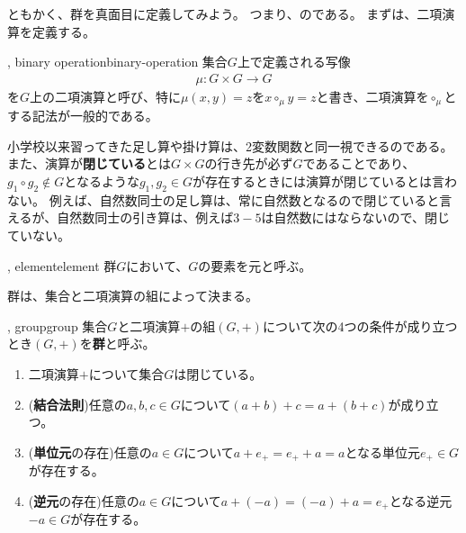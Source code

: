ともかく、群を真面目に定義してみよう。
つまり、のである。
まずは、二項演算を定義する。

\begin{Defi}{, binary operation}{binary-operation}
集合$G$上で定義される写像
\begin{align*}
\mu : G \times G \to G
\end{align*}
を$G$上の二項演算と呼び、特に$\mu(x,y)=z$を$x\circ_{\mu}y=z$と書き、二項演算を$\circ_{\mu}$とする記法が一般的である。
\end{Defi}

小学校以来習ってきた足し算や掛け算は、2変数関数と同一視できるのである。
また、演算が\textbf{閉じている}とは$G\times{G}$の行き先が必ず$G$であることであり、$g_1\circ{g_2}\not\in{G}$となるような$g_1,g_2\in{G}$が存在するときには演算が閉じているとは言わない。
例えば、自然数同士の足し算は、常に自然数となるので閉じていると言えるが、自然数同士の引き算は、例えば$3-5$は自然数にはならないので、閉じていない。

\begin{Defi}{, element}{element}
群$G$において、$G$の要素を元と呼ぶ。
\end{Defi}

群は、集合と二項演算の組によって決まる。

\begin{Defi}{, group}{group}
集合$G$と二項演算$+$の組$(G,+)$について次の4つの条件が成り立つとき$(G,+)$を\textbf{群}と呼ぶ。
\begin{enumerate}
 \item 二項演算$+$について集合$G$は閉じている。
 \item (\textbf{結合法則})任意の$a,b,c{\in}G$について$(a{+}b){+}c=a{+}(b{+}c)$が成り立つ。
 \item (\textbf{単位元}の存在)任意の$a{\in}G$について$a{+}e_+=e_+{+}a=a$となる単位元$e_+\in{G}$が存在する。
 \item (\textbf{逆元}の存在)任意の$a{\in}G$について$a{+}(-a)=(-a){+}a=e_+$となる逆元$-a\in{G}$が存在する。
\end{enumerate}
\end{Defi}

